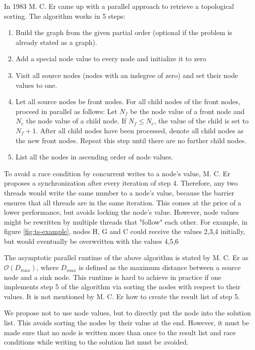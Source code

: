  In 1983 M. C. Er \cite{er1983parallel} came up with a parallel approach to retrieve a topological sorting. The algorithm works in 5 steps:
 \begin{enumerate}
        \item Build the graph from the given partial order (optional if the problem is already stated as a graph).
        \item Add a special node value to every node and initialize it to zero
        \item Visit all source nodes (nodes with an indegree of zero) and set their node values to one.
        \item Let all source nodes be front nodes. For all child nodes of the front nodes, proceed in parallel as follows: Let $N_f$ be the node value of a front node and $N_c$ the node value of a child node. If $N_f \leq N_c$, the value of the child is set to $N_f + 1$. After all child nodes have been processed, denote all child nodes as the new front nodes. Repeat this step until there are no further child nodes. 
        \item List all the nodes in ascending order of node values.
 \end{enumerate}
 
To avoid a race condition by concurrent writes to a node’s value, M. C. Er proposes a synchronization after every iteration of step 4. Therefore, any two threads would write the same number to a node’s value, because the barrier ensures that all threads are in the same iteration. This comes at the price of a lower performance, but avoids locking the node's value. However, node values might be rewritten by multiple threads that "follow" each other. For example, in figure \ref{fig:ts-example}, nodes H, G and C could receive the values 2,3,4 initially, but would eventually be overwritten with the values 4,5,6

The asymptotic parallel runtime of the above algorithm is stated by M. C. Er as $\mathcal{O}(D_{max})$, where $D_{max}$ is defined as the maximum distance between a source node and a sink node. This runtime is hard to achieve in practice if one implements step 5 of the algorithm via sorting the nodes with respect to their values. It is not mentioned by M. C. Er how to create the result list of step 5.

We propose not to use node values, but to directly put the node into the solution list. This avoids sorting the nodes by their value at the end. However, it must be made sure that no node is written more than once to the result list and race conditions while writing to the solution list must be avoided.

